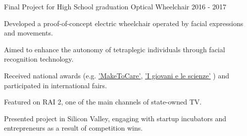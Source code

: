 \begin{cventries}
  \cventry
    {Final Project for High School graduation} %
    {Optical Wheelchair} %
    {} %
    {2016 - 2017} %
    {
      \begin{cvitems} %
        \item {Developed a proof-of-concept electric wheelchair operated by facial expressions and movements.}
        \item {Aimed to enhance the autonomy of tetraplegic individuals through facial recognition technology.}
        \item {Received national awards (e.g. 
            \href{https://www.maketocare.it/?sc_lang=en}{'MakeToCare'},
            \href{https://fast.mi.it/i-giovani-e-le-scienze/}{'I giovani e le scienze'}
            ) and participated in international fairs.}
        \item {Featured on RAI 2, one of the main channels of state-owned TV.}
        \item {Presented project in Silicon Valley, engaging with startup incubators and entrepreneurs as a result of competition wins.}
      \end{cvitems}
    }


\end{cventries}
